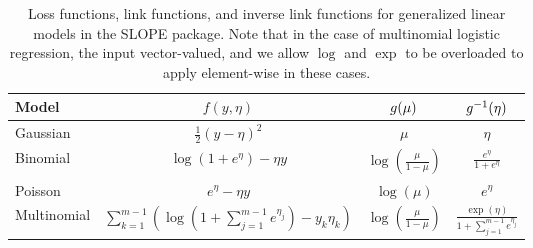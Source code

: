 \documentclass[article]{jss}
\begin{document}
\begin{table}[t!]
  \centering
  \label{tab:glm}
  \begin{tabular}{lccc}
    \toprule
    Model       & \(f(y, \eta)\)                                                                                       & \(g(\mu)\)                            & \(g^{-1}(\eta)\)                                       \\
    \midrule
    Gaussian    & \(\frac{1}{2}(y - \eta)^2\)                                                                          & \(\mu\)                                   & \(\eta\)                                               \\
    \addlinespace
    Binomial    & \(\log(1 + e^\eta) - \eta y\)                                                                        & \(\log \left(\frac{\mu}{1 - \mu}\right)\) & \(\frac{e^\eta}{1 + e^\eta}\)                          \\
    \addlinespace
    Poisson     & \(e^\eta - \eta y\)                                                                                  & \(\log(\mu)\)                             & \(e^\eta\)                                             \\
    \addlinespace
    Multinomial & \(\sum_{k=1}^{m-1}\left( \log \left( 1 +  \sum_{j=1}^{m-1} e^{\eta_j}\right) - y_k \eta_k  \right)\) & \(\log\left(\frac{\mu}{1 - \mu}\right) \) & \(\frac{\exp(\eta)}{1 + \sum_{j=1}^{m-1} e^{\eta_j}}\) \\
    \bottomrule
  \end{tabular}
  \caption{Loss functions, link functions, and inverse link functions for
    generalized linear models in the SLOPE package. Note that in the case of
    multinomial logistic regression, the input vector-valued, and we allow
    \(\log\) and \(\exp\) to be overloaded to apply element-wise in these cases.
  }
\end{table}
\end{document}
